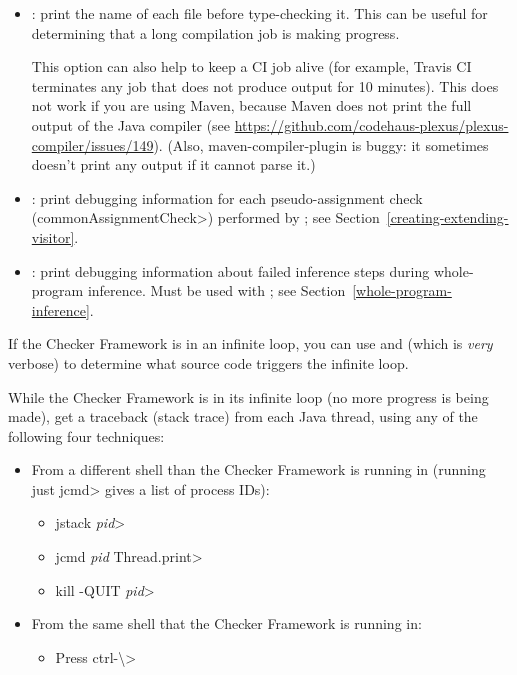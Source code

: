 \begin{itemize}

\item {}: print the name of each file before type-checking it.
This can be useful for determining that a long compilation job is making
progress.

This option can also help to keep a CI job alive (for example, Travis CI
terminates any job that does not produce output for 10 minutes).
This does not work if you are using Maven, because Maven does not print
the full output of the Java compiler (see \url{https://github.com/codehaus-plexus/plexus-compiler/issues/149}).
(Also, maven-compiler-plugin is buggy: it sometimes
doesn't print any output if it cannot parse it.)

\item {}: print debugging information for each
pseudo-assignment check (\<commonAssignmentCheck>) performed by
; see
Section~\ref{creating-extending-visitor}.

\item {}: print debugging information
about failed inference steps during whole-program inference. Must
be used with ; see Section~\ref{whole-program-inference}.

\end{itemize}

If the Checker Framework is in an infinite loop, you can use
 and  (which is \emph{very} verbose)
to determine what source code triggers the infinite loop.

While the Checker Framework is in its infinite loop (no more progress is
being made), get a traceback (stack trace) from each Java thread,
using any of the following four techniques:

\begin{itemize}
  \item From a different shell than the Checker Framework is running in
    (running just \<jcmd> gives a list of process IDs):
  \begin{itemize}
    \item \<jstack \emph{pid}>
    \item \<jcmd \emph{pid} Thread.print>
    \item \<kill -QUIT \emph{pid}>
  \end{itemize}
  \item From the same shell that the Checker Framework is running in:
  \begin{itemize}
    \item Press \<ctrl-\textbackslash>
  \end{itemize}
\end{itemize}


